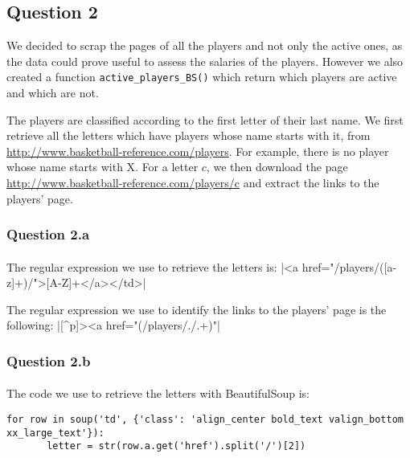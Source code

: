 
\subsection{Question 2}
\label{subsec:312}
We decided to scrap the pages of all the players and not only the active ones, as the data could prove useful to assess the salaries of the players. However we also created a function \verb|active_players_BS()| which return which players are active and which are not.

The players are classified according to the first letter of their last name. We first retrieve all the letters which have players whose name starts with it, from \url{http://www.basketball-reference.com/players}. For example, there is no player whose name starts with X. For a letter $c$, we then download the page \url{http://www.basketball-reference.com/players/c} and extract the links to the players' page.

\subsubsection{Question 2.a}
\label{subsubsec:312a}
\paragraph{} The regular expression we use to retrieve the letters is: |<a href="/players/([a-z]+)/">[A-Z]+</a></td>|

The regular expression we use to identify the links to the players' page is the following:
|[^p]><a href="(/players/./.+)"|


\subsubsection{Question 2.b}
\label{subsubsec:312b}
\paragraph{}  The code we use to retrieve the letters with BeautifulSoup is:
\begin{verbatim}
for row in soup('td', {'class': 'align_center bold_text valign_bottom xx_large_text'}):
       letter = str(row.a.get('href').split('/')[2])
\end{verbatim}

